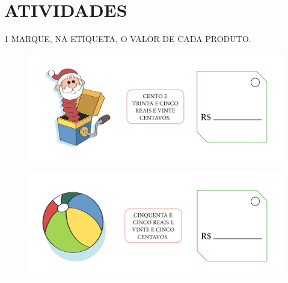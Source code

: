 


\section{ATIVIDADES}

\num{1} MARQUE, NA ETIQUETA, O VALOR DE CADA PRODUTO.


\begin{figure}[htpb!]
\includegraphics[width=\textwidth]{./media/SAEB_1ANO_MAT_FIGURA65.png}
\end{figure}

\pagebreak

\begin{figure}[htpb!]
\includegraphics[width=\textwidth]{./media/SAEB_1ANO_MAT_FIGURA66.png}
\end{figure}

